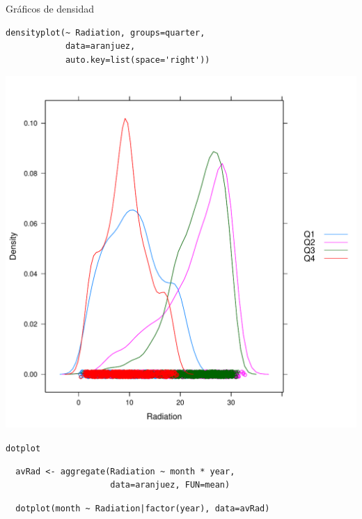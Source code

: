 \documentclass[xcolor={usenames,svgnames,dvipsnames}]{beamer}
\begin{document}
\begin{frame}[fragile,label=sec-2-1-46]{Gráficos de densidad}
 \lstset{language=R,label= ,caption= ,numbers=none}
\begin{lstlisting}
densityplot(~ Radiation, groups=quarter,
            data=aranjuez,
            auto.key=list(space='right'))
\end{lstlisting}
\end{frame}

\begin{frame}[label=sec-2-1-47]{}
\includegraphics[width=.9\linewidth]{figs/density.pdf}
\end{frame}

\begin{frame}[fragile,label=sec-2-1-48]{\texttt{dotplot}}
 \lstset{language=R,label= ,caption= ,numbers=none}
\begin{lstlisting}
  avRad <- aggregate(Radiation ~ month * year,
                     data=aranjuez, FUN=mean)
\end{lstlisting}

\lstset{language=R,label= ,caption= ,numbers=none}
\begin{lstlisting}
  dotplot(month ~ Radiation|factor(year), data=avRad)
\end{lstlisting}
\end{frame}
\end{document}
